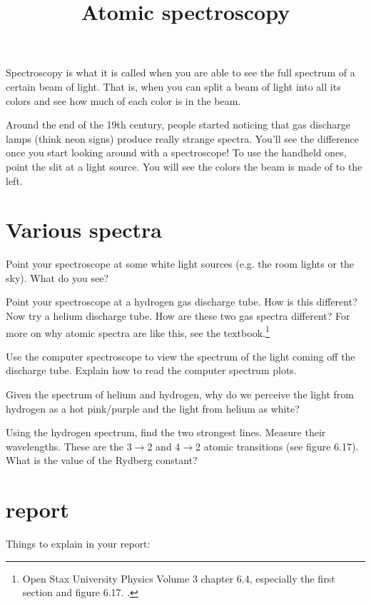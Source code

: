 \documentclass[phy1200]{handout}
\title{Atomic spectroscopy}
\begin{document}
\maketitle

Spectroscopy is what it is called when you are able to see the full spectrum of a certain beam of light. That is, when you can split a beam of light into all its colors and see how much of each color is in the beam. 

Around the end of the 19th century, people started noticing that gas discharge lamps (think neon signs) produce really strange spectra. You'll see the difference once you start looking around with a spectroscope! To use the handheld ones, point the slit at a light source. You will see the colors the beam is made of to the left. 

\section{Various spectra}
Point your spectroscope at some white light sources (e.g. the room lights or the sky). What do you see?

Point your spectroscope at a hydrogen gas discharge tube. How is this different? Now try a helium discharge tube. How are these two gas spectra different? For more on why atomic spectra are like this, see the textbook.\footnote{Open Stax University Physics Volume 3 chapter 6.4, especially the first section and figure 6.17. .}

Use the computer spectroscope to view the spectrum of the light coming off the discharge tube. Explain how to read the computer spectrum plots. 

Given the spectrum of helium and hydrogen, why do we perceive the light from hydrogen as a hot pink/purple and the light from helium as white?

Using the hydrogen spectrum, find the two strongest lines. Measure their wavelengths. These are the 3$\to$2 and 4$\to$2 atomic transitions (see figure 6.17). What is the value of the Rydberg constant? 


\section{report}
Things to explain in your report:
\end{document}
